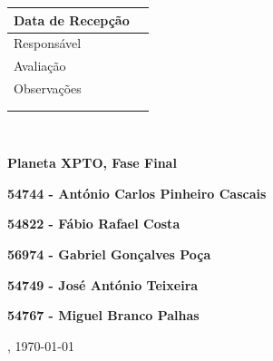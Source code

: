\documentclass[12pt,a4paper,portuges]{style/myreport}
\newcommand{\TituloProjecto}{Planeta XPTO, Fase Final}
\newcommand{\PrimeiroElemento}{54744 - António Carlos Pinheiro Cascais}
\newcommand{\SegundoElemento}{54822 - Fábio Rafael Costa}
\newcommand{\TerceiroElemento}{56974 - Gabriel Gonçalves Poça}
\newcommand{\QuartoElemento}{54749 - José António Teixeira}
\newcommand{\QuintoElemento}{54767 - Miguel Branco Palhas}
\begin{document}
\newpage

\thispagestyle{empty}

\begin{flushright}
\begin{tabular}{|p{4cm}|p{4cm}|}
\hline
Data de Recepção & \\
\hline
Responsável & \\
\hline
Avaliação & \\
\hline
Observações & \\
& \\
& \\
\hline
\end{tabular}
\end{flushright}

~

\addvspace{8.4cm}

{\LARGE \textbf{ \TituloProjecto }}

\addvspace{2.5cm}

\textbf{\PrimeiroElemento}

\bigskip

\textbf{\SegundoElemento}

\bigskip

\textbf{\TerceiroElemento}

\bigskip

\textbf{\QuartoElemento}

\bigskip

\textbf{\QuintoElemento}

\addvspace{1.5cm}

{\large \monthname,  \dashdate\today}

\newpage




%

\tableofcontents
{}

\listoffigures
{}

\end{document}
